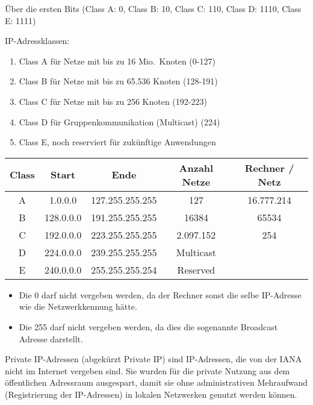 Über die ersten Bits (Class A: 0, Class B: 10, Class C: 110, Class D: 1110, Class E: 1111)

IP-Adressklassen:
\begin{enumerate}
    \item Class A für Netze mit bis zu 16 Mio.\ Knoten (0-127)
    \item Class B für Netze mit bis zu 65.536 Knoten (128-191)
    \item Class C für Netze mit bis zu 256 Knoten (192-223)
    \item Class D für Gruppenkommunikation (Multicast) (224)
    \item Class E, noch reserviert für zukünftige Anwendungen
\end{enumerate}
\begin{center}
    \begin{tabular}{|c|c|c|c|c|}
        \hline
        Class & Start & Ende & Anzahl Netze & Rechner / Netz \tabularnewline
        \hline
        A & 1.0.0.0 & 127.255.255.255 & 127 & 16.777.214 \tabularnewline
        \hline
        B & 128.0.0.0 & 191.255.255.255 & 16384 & 65534 \tabularnewline
        \hline
        C & 192.0.0.0 & 223.255.255.255 & 2.097.152 & 254 \tabularnewline
        \hline
        D & 224.0.0.0 & 239.255.255.255 & Multicast & \tabularnewline
        \hline
        E & 240.0.0.0 & 255.255.255.254 & Reserved & \tabularnewline
        \hline
    \end{tabular}
\end{center}

\begin{itemize}
    \item Die 0 darf nicht vergeben werden, da der Rechner sonst die selbe IP-Adresse wie die Netzwerkkennung hätte.
    \item Die 255 darf nicht vergeben werden, da dies die sogenannte Broadcast Adresse darstellt.
\end{itemize}

Private IP-Adressen (abgekürzt Private IP) sind IP-Adressen, die von der IANA nicht im Internet vergeben sind.
Sie wurden für die private Nutzung aus dem öffentlichen Adressraum ausgespart, damit sie ohne administrativen Mehraufwand (Registrierung der IP-Adressen) in lokalen Netzwerken genutzt werden können.

